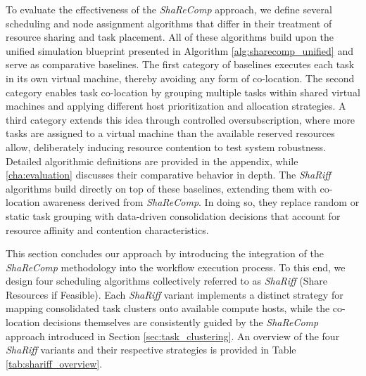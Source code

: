 To evaluate the effectiveness of the \textit{ShaReComp} approach, we define several scheduling and node assignment algorithms that differ in their treatment of resource sharing and task placement. All of these algorithms build upon the unified simulation blueprint presented in Algorithm \ref{alg:sharecomp_unified} and serve as comparative baselines. The first category of baselines executes each task in its own virtual machine, thereby avoiding any form of co-location. The second category enables task co-location by grouping multiple tasks within shared virtual machines and applying different host prioritization and allocation strategies. A third category extends this idea through controlled oversubscription, where more tasks are assigned to a virtual machine than the available reserved resources allow, deliberately inducing resource contention to test system robustness. Detailed algorithmic definitions are provided in the appendix, while \ref{cha:evaluation} discusses their comparative behavior in depth. The \textit{ShaRiff} algorithms build directly on top of these baselines, extending them with co-location awareness derived from \textit{ShaReComp}. In doing so, they replace random or static task grouping with data-driven consolidation decisions that account for resource affinity and contention characteristics.

\label{sec:co-location_strategies}

This section concludes our approach by introducing the integration of the \textit{ShaReComp} methodology into the workflow execution process. To this end, we design four scheduling algorithms collectively referred to as \textit{ShaRiff} (Share Resources if Feasible). Each \textit{ShaRiff} variant implements a distinct strategy for mapping consolidated task clusters onto available compute hosts, while the co-location decisions themselves are consistently guided by the \textit{ShaReComp} approach introduced in Section \ref{sec:task_clustering}. An overview of the four \textit{ShaRiff} variants and their respective strategies is provided in Table \ref{tab:shariff_overview}.

